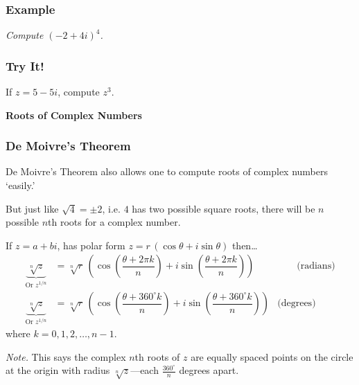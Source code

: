\documentclass[12pt,xcolor={usenames,dvipsnames,x11names}]{beamer}
\begin{document}
\begin{frame}[t] \frametitle{Example}
{\small\itshape Compute $(-2 + 4i)^4$.} \par\vspace{0.5cm}

\end{frame}



\begin{frame}[t] \frametitle{Try It!}
{\footnotesize If $z= 5 - 5i$, compute $z^3$.}
\end{frame}



\begin{frame}[t]
\phantom{.}\vfill \begin{center} \bfseries \LARGE \color{eblue} Roots of Complex Numbers \end{center} \vfill
\end{frame}



\begin{frame}[t] \frametitle{De Moivre's Theorem}
\scriptsize De Moivre's Theorem also allows one to compute roots of complex numbers `easily.' \par\vspace{0.3cm}

But just like $\sqrt{4}= \pm 2$, i.e. $4$ has two possible square roots, there will be $n$ possible $n$th roots for a complex number.

\begin{mythm}
\footnotesize\color{egold} If $z= a + bi$, has polar form $z= r \,(\cos \theta + i \sin \theta)$ then\dots
	\[
	\begin{aligned}
	\underbrace{\sqrt[n]{z}}_{\text{Or } z^{1/n}}&= \sqrt[n]{r} \, \left( \cos \left( \dfrac{\theta + 2\pi k}{n} \right) + i \sin \left( \dfrac{\theta + 2\pi k}{n} \right) \right) & \qquad \text{(radians)} \\[0.5cm]
	\underbrace{\sqrt[n]{z}}_{\text{Or } z^{1/n}}&= \sqrt[n]{r} \, \left( \cos \left( \dfrac{\theta + 360^\circ k}{n} \right) + i \sin \left( \dfrac{\theta + 360^\circ k}{n} \right) \right) & \text{(degrees)}
	\end{aligned}
	\]
where $k= 0, 1, 2, \ldots, n-1$.
\end{mythm} \par\vspace{0.4cm}

{\scriptsize\textit{Note.} This says the complex $n$th roots of $z$ are equally spaced points on the circle at the origin with radius $\sqrt[n]{z}$---each $\frac{360^\circ}{n}$ degrees apart.}
\end{frame}
\end{document}
